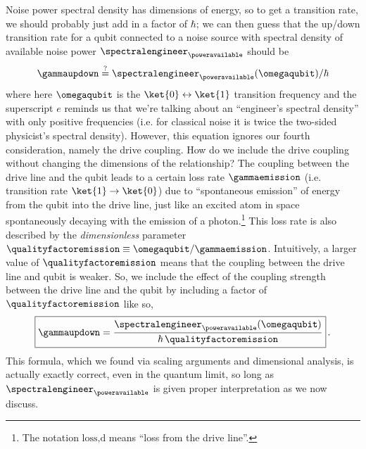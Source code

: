 Noise power spectral density has dimensions of energy, so to get a transition rate, we should probably just add in a factor of $\hbar$; we can then guess that the up/down transition rate for a qubit connected to a noise source with spectral density of available noise power $\spectralengineer_{\poweravailable}$ should be
\begin{equation}
    \gammaupdown \stackrel{?}{=} \spectralengineer_{\poweravailable} (\omegaqubit) / \hbar \nonumber
\end{equation}
where here $\omegaqubit$ is the $\ket{0} \leftrightarrow \ket{1}$ transition frequency and the superscript $e$ reminds us that we're talking about an ``engineer's spectral density'' with only positive frequencies (i.e. for classical noise it is twice the two-sided physicist's spectral density).
However, this equation ignores our fourth consideration, namely the drive coupling.
How do we include the drive coupling without changing the dimensions of the relationship?
The coupling between the drive line and the qubit leads to a certain loss rate $\gammaemission$ (i.e. transition rate $\ket{1} \rightarrow \ket{0}$) due to ``spontaneous emission'' of energy from the qubit into the drive line, just like an excited atom in space spontaneously decaying with the emission of a photon.\footnote{The notation $\text{loss,d}$ means ``loss from the drive line''.}
This loss rate is also described by the \emph{dimensionless} parameter $\qualityfactoremission \equiv \omegaqubit / \gammaemission$.
Intuitively, a larger value of $\qualityfactoremission$ means that the coupling between the drive line and qubit is weaker.
So, we include the effect of the coupling strength between the drive line and the qubit by including a factor of $\qualityfactoremission$ like so,
\begin{equation}
  \boxed{
    \gammaupdown = \frac{\spectralengineer_{\poweravailable} (\omegaqubit)}{\hbar \, \qualityfactoremission}
    \label{eq:gamma_up_down_noise}
  }
  \, .
\end{equation}
This formula, which we found via scaling arguments and dimensional analysis, is actually exactly correct, even in the quantum limit, so long as $\spectralengineer_{\poweravailable}$ is given proper interpretation as we now discuss.


